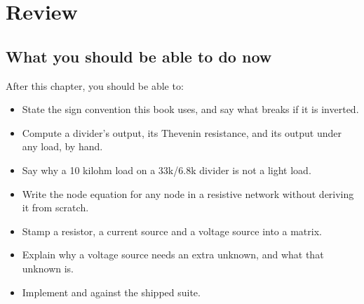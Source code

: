

\section{Review}
\label{c1:sec:review}

\subsection*{What you should be able to do now}
After this chapter, you should be able to:
\begin{itemize}
  \item State the sign convention this book uses, and say what breaks if it is inverted.
  \item Compute a divider's output, its Thevenin resistance, and its output under any load, by hand.
  \item Say why a 10 kilohm load on a 33k/6.8k divider is not a light load.
  \item Write the node equation for any node in a resistive network without deriving it from scratch.
  \item Stamp a resistor, a current source and a voltage source into a matrix.
  \item Explain why a voltage source needs an extra unknown, and what that unknown is.
  \item Implement  and  against the shipped suite.
\end{itemize}

